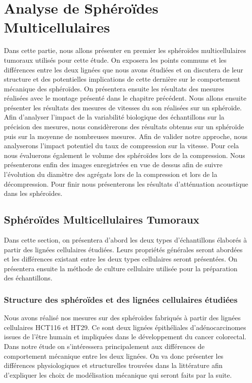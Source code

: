 

\chapter{Analyse de Sphéroïdes Multicellulaires}

Dans cette partie, nous allons présenter en premier les sphéroïdes multicellulaires tumoraux utilisés pour cette étude. On exposera les points communs et les différences entre les deux lignées que nous avons étudiées et on discutera de  leur structure et des potentielles implications de cette dernière sur le comportement mécanique des sphéroïdes.  On présentera ensuite les résultats des mesures réalisées avec le montage présenté dans le chapitre précédent. Nous allons ensuite présenter les résultats des mesures de vitesses du son réalisées sur un sphéroïde. Afin d'analyser l'impact de la variabilité biologique des échantillons sur la précision des mesures, nous considèrerons des résultats obtenus sur un sphéroïde puis sur la moyenne de nombreuses mesures.  Afin de valider notre approche, nous analyserons l'impact potentiel du taux de compression sur la vitesse. Pour cela nous évaluerons également le volume des sphéroïdes lors de la compression. Nous présenterons enfin des images enregistrées en vue de dessus afin de suivre  l'évolution du diamètre des agrégats lors de la compression et lors de la décompression. Pour finir nous présenterons les résultats d'atténuation acoustique dans les sphéroïdes.

\section{Sphéroïdes Multicellulaires Tumoraux}
Dans cette section, on présentera d'abord les deux types d'échantillons élaborés à partir des lignées cellulaires étudiées. Leurs propriétés générales seront abordées et les différences existant entre les deux types cellulaires seront présentées. On présentera ensuite la méthode de culture cellulaire utilisée pour la préparation des échantillons.

\subsection{Structure des sphéroïdes et des lignées cellulaires étudiées}
Nous avons réalisé nos mesures sur des sphéroïdes fabriqués à partir des lignées cellulaires HCT116 et HT29. Ce sont deux lignées épithéliales d'adénocarcinomes issues de l'être humain et impliquées dans le développement du cancer colorectal.\cite{Rajput2008}\cite{Forgue1990} Dans notre étude on s'intéressera principalement aux différences  de comportement mécanique entre les deux lignées. On va donc présenter les différences physiologiques et structurelles trouvées dans la littérature afin d'expliquer les choix de modélisation mécanique qui seront faits par la suite.

